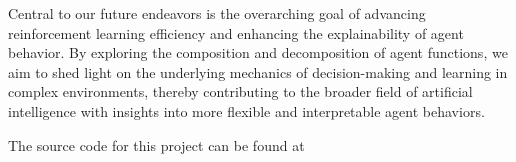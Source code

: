 \documentclass[journal]{IEEEtran}
\begin{document}
		Central to our future endeavors is the overarching goal of advancing reinforcement learning efficiency 
		and enhancing the explainability of agent behavior. 
		By exploring the composition and decomposition of agent functions, 
		we aim to shed light on the underlying mechanics of decision-making and learning in complex environments, 
		thereby contributing to the broader field of artificial intelligence with insights into more flexible and interpretable agent behaviors.
		
		The source code for this project can be found at  %
		
	\begin{comment}
		
	\end{comment}
	
		
	\label{sec:references}
	
	
	
	
\end{document}
